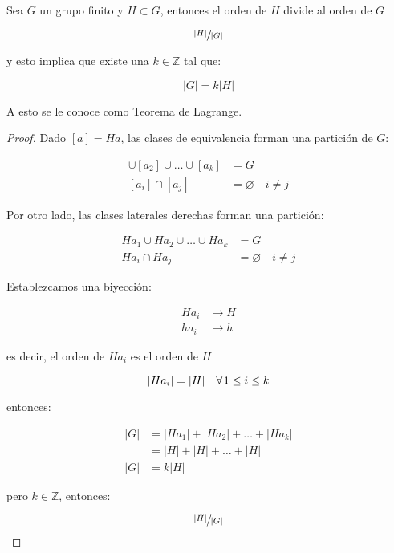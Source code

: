         \begin{teorema}
            Sea $G$ un grupo finito y $H \subset G$, entonces el orden de $H$ divide al orden de $G$

            \begin{equation}
                \sfrac{|H|}{|G|}
            \end{equation}

            y esto implica que existe una $k \in \mathbb{Z}$ tal que:

            \begin{equation}
                |G| = k |H|
            \end{equation}

            A esto se le conoce como Teorema de Lagrange.
        \end{teorema}

        \begin{proof}
            Dado $[a] = Ha$, las clases de equivalencia forman una partición de $G$:

            \begin{align*}
                [a_1] \cup [a_2] \cup \dots \cup [a_k] &= G \\[0cm]
                [a_i] \cap [a_j] &= \varnothing \quad i \ne j
            \end{align*}

            Por otro lado, las clases laterales derechas forman una partición:

            \begin{align*}
                H a_1 \cup H a_2 \cup \dots \cup H a_k &= G \\
                H a_i \cap H a_j &= \varnothing \quad i \ne j
            \end{align*}

            Establezcamos una biyección:

            \begin{align*}
                Ha_i &\to H \\
                ha_i &\to h
            \end{align*}

            es decir, el orden de $Ha_i$ es el orden de $H$

            \begin{equation*}
                |Ha_i| = |H| \quad \forall \mkern2mu 1 \le i \le k
            \end{equation*}

            entonces:

            \begin{align*}
                |G| &= |Ha_1| + |Ha_2| + \dots + |Ha_k| \\
                &= |H| + |H| + \dots + |H| \\
                |G| &= k |H|
            \end{align*}

            pero $k \in \mathbb{Z}$, entonces:

            \begin{equation*}
                \sfrac{|H|}{|G|}
            \end{equation*}
        \end{proof}

